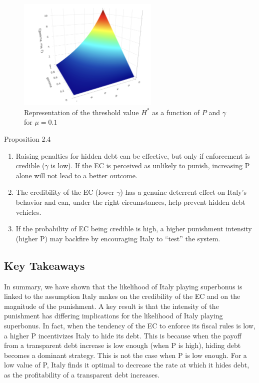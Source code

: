 \documentclass{article}
\begin{document}
\begin{figure}[H]  
    \centering  
    \includegraphics[width=0.6\textwidth]{Graphs/3DGraph.png}  
    \caption{Representation of the threshold value $H^*$ as a function of $P$ and $\gamma$ for $\mu=0.1$}  
\end{figure}  

\begin{simplebox}{Proposition 2.4}
\begin{enumerate}
    \item Raising penalties for hidden debt can be effective, but only if enforcement is credible ($\gamma$ is low). If the EC is perceived as unlikely to punish, increasing P alone will not lead to a better outcome.
    \item The credibility of the EC (lower $\gamma$) has a genuine deterrent effect on Italy's behavior and can, under the right circumstances, help prevent hidden debt vehicles. 
    \item If the probability of EC being credible is high, a higher punishment intensity (higher P) may backfire by encouraging Italy to “test” the system.
\end{enumerate}
\end{simplebox}

\subsection{Key Takeaways}

In summary, we have shown that the likelihood of Italy playing superbonus is linked to the assumption Italy makes on the credibility of the EC and on the magnitude of the punishment. A key result is that the intensity of the punishment has differing implications for the likelihood of Italy playing superbonus. In fact, when the tendency of the EC to enforce its fiscal rules is low, a higher P incentivizes Italy to hide its debt. This is because when the payoff from a transparent debt increase is low enough (when P is high), hiding debt becomes a dominant strategy. This is not the case when P is low enough. For a low value of P, Italy finds it optimal to decrease the rate at which it hides debt, as the profitability of a transparent debt increases. 
\end{document}
